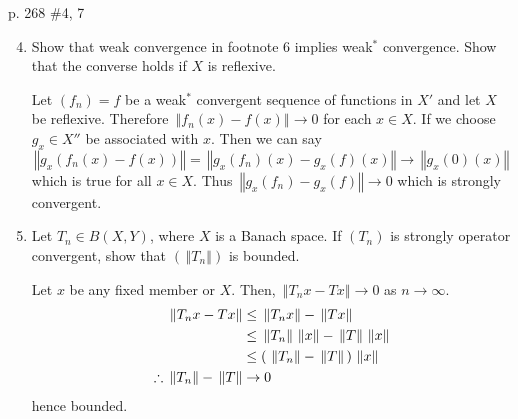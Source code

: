 \documentclass[10pt,a4paper]{report}
\newcommand{\NORM}[1]{\,\left \Vert #1 \right \Vert}
\begin{document}
\newpage p. 268 \#4, 7
\begin{enumerate}
	\setcounter{enumi}{3}
	\item Show that weak convergence in footnote 6 implies weak$^*$ convergence.  Show that the converse holds if $X$ is reflexive.
	
	Let $(f_n)=f$ be a weak$^*$ convergent sequence of functions in $X'$ and let $X$ be reflexive.  Therefore $\NORM{f_n(x)-f(x)} \to 0$ for each $x \in X$.  If we choose $g_x \in X''$ be associated with $x$.  Then we can say $\NORM{g_x(f_n(x) - f(x))} = \NORM{g_x(f_n)(x) - g_x(f)(x)} \to \NORM{g_x(0)(x)}$ which is true for all $x\in X$. Thus $\NORM{g_x(f_n)-g_x(f)} \to 0$ which is strongly convergent.
	
	\setcounter{enumi}{6}
	\item Let $T_n \in B(X,Y)$, where $X$ is a Banach space.  If $(T_n)$ is strongly operator convergent, show that $(\NORM{T_n})$ is bounded.
	
	Let $x$ be any fixed member or $X$.  Then, $\NORM{T_nx - Tx} \to 0$ as $n \to \infty$.  
	\begin{align*}
		\NORM{T_nx - Tx} &\le \NORM{T_nx} - \NORM{Tx}\\
		&\le \NORM{T_n}\NORM{x} - \NORM{T}\NORM{x} \\
		&\le \PAREN{\NORM{T_n} - \NORM{T}} \NORM{x} \\
		\therefore \NORM{T_n} - \NORM{T} &\to 0
	\end{align*}hence bounded.

\end{enumerate}
\end{document}
